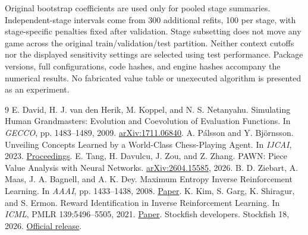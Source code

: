 \documentclass[11pt]{article}
\begin{document}
Original bootstrap coefficients are used only for pooled stage summaries. Independent-stage intervals come from 300 additional refits, 100 per stage, with stage-specific penalties fixed after validation. Stage subsetting does not move any game across the original train/validation/test partition. Neither context cutoffs nor the displayed sensitivity settings are selected using test performance. Package versions, full configurations, code hashes, and engine hashes accompany the numerical results. No fabricated value table or unexecuted algorithm is presented as an experiment.
\FloatBarrier
\begin{thebibliography}{9}\small
{} E. David, H. J. van den Herik, M. Koppel, and N. S. Netanyahu. Simulating Human Grandmasters: Evolution and Coevolution of Evaluation Functions. In \emph{GECCO}, pp. 1483--1489, 2009. \href{https://arxiv.org/abs/1711.06840}{arXiv:1711.06840}.
 A. P\'alsson and Y. Bj\"ornsson. Unveiling Concepts Learned by a World-Class Chess-Playing Agent. In \emph{IJCAI}, 2023. \href{https://www.ijcai.org/proceedings/2023/541}{Proceedings}.
 E. Tang, H. Davulcu, J. Zou, and Z. Zhang. PAWN: Piece Value Analysis with Neural Networks. \href{https://arxiv.org/abs/2604.15585}{arXiv:2604.15585}, 2026.
 B. D. Ziebart, A. Maas, J. A. Bagnell, and A. K. Dey. Maximum Entropy Inverse Reinforcement Learning. In \emph{AAAI}, pp. 1433--1438, 2008. \href{https://www.cs.cmu.edu/~bziebart/publications/maximum-entropy-inverse-reinforcement-learning.html}{Paper}.
 K. Kim, S. Garg, K. Shiragur, and S. Ermon. Reward Identification in Inverse Reinforcement Learning. In \emph{ICML}, PMLR 139:5496--5505, 2021. \href{https://proceedings.mlr.press/v139/kim21c.html}{Paper}.
 Stockfish developers. Stockfish 18, 2026. \href{https://github.com/official-stockfish/Stockfish/releases/tag/sf_18}{Official release}.
\end{thebibliography}
\end{document}

